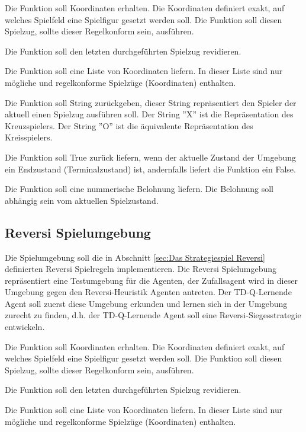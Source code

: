 Die Funktion soll Koordinaten erhalten. Die Koordinaten definiert exakt, auf welches Spielfeld eine Spielfigur gesetzt werden soll. Die Funktion soll diesen Spielzug, sollte dieser Regelkonform sein, ausführen.

Die Funktion soll den letzten durchgeführten Spielzug revidieren.

Die Funktion soll eine Liste von Koordinaten liefern. In dieser Liste sind nur mögliche und regelkonforme Spielzüge (Koordinaten) enthalten.

Die Funktion soll String zurückgeben, dieser String repräsentiert den Spieler der aktuell einen Spielzug ausführen soll. Der String ''X'' ist die Repräsentation des Kreuzspielers. Der String ''O'' ist die äquivalente Repräsentation des Kreisspielers.

Die Funktion soll True zurück liefern, wenn der aktuelle Zustand der Umgebung ein Endzustand (Terminalzustand) ist, andernfalls liefert die Funktion ein False.

Die Funktion soll eine nummerische Belohnung liefern. Die Belohnung soll abhängig sein vom aktuellen Spielzustand.

\subsection{Reversi Spielumgebung}
Die Spielumgebung soll die in Abschnitt \ref{sec:Das Strategiespiel Reversi} definierten Reversi Spielregeln implementieren. Die Reversi Spielumgebung repräsentiert eine Testumgebung für die Agenten, der Zufallsagent wird in dieser Umgebung gegen den Reversi-Heuristik Agenten antreten. Der TD-Q-Lernende Agent soll zuerst diese Umgebung erkunden und lernen sich in der Umgebung zurecht zu finden, d.h. der TD-Q-Lernende Agent soll eine Reversi-Siegesstrategie entwickeln. 

Die Funktion soll Koordinaten erhalten. Die Koordinaten definiert exakt, auf welches Spielfeld eine Spielfigur gesetzt werden soll. Die Funktion soll diesen Spielzug, sollte dieser Regelkonform sein, ausführen.

Die Funktion soll den letzten durchgeführten Spielzug revidieren.

Die Funktion soll eine Liste von Koordinaten liefern. In dieser Liste sind nur mögliche und regelkonforme Spielzüge (Koordinaten) enthalten.

